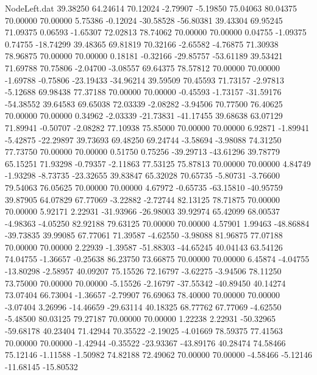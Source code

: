 \begin{filecontents}{NodeLeft.dat}
  39.38250   64.24614   70.12024    -2.79907   -5.19850   75.04063   80.04375   70.00000   70.00000    5.75386   -0.12024  -30.58528  -56.80381
  39.43304   69.95245   71.09375     0.06593   -1.65307   72.02813   78.74062   70.00000   70.00000    0.04755   -1.09375    0.74755  -18.74299
  39.48365   69.81819   70.32166    -2.65582   -4.76875   71.30938   78.96875   70.00000   70.00000    0.18181   -0.32166  -29.85757  -53.61189
  39.53421   71.69788   70.75806    -2.04700   -3.08557   69.64375   78.57812   70.00000   70.00000   -1.69788   -0.75806  -23.19433  -34.96214
  39.59509   70.45593   71.73157    -2.97813   -5.12688   69.98438   77.37188   70.00000   70.00000   -0.45593   -1.73157  -31.59176  -54.38552
  39.64583   69.65038   72.03339    -2.08282   -3.94506   70.77500   76.40625   70.00000   70.00000    0.34962   -2.03339  -21.73831  -41.17455
  39.68638   63.07129   71.89941    -0.50707   -2.08282   77.10938   75.85000   70.00000   70.00000    6.92871   -1.89941   -5.42875  -22.29897
  39.73693   69.48250   69.24744    -3.58694   -3.98088   74.31250   77.73750   70.00000   70.00000    0.51750    0.75256  -39.29713  -43.61296
  39.78779   65.15251   71.93298    -0.79357   -2.11863   77.53125   75.87813   70.00000   70.00000    4.84749   -1.93298   -8.73735  -23.32655
  39.83847   65.32028   70.65735    -5.80731   -3.76600   79.54063   76.05625   70.00000   70.00000    4.67972   -0.65735  -63.15810  -40.95759
  39.87905   64.07829   67.77069    -3.22882   -2.72744   82.13125   78.71875   70.00000   70.00000    5.92171    2.22931  -31.93966  -26.98003
  39.92974   65.42099   68.00537    -4.98363   -4.05250   82.92188   79.63125   70.00000   70.00000    4.57901    1.99463  -48.86884  -39.73835
  39.99085   67.77061   71.39587    -4.62550   -3.98088   81.96875   77.07188   70.00000   70.00000    2.22939   -1.39587  -51.88303  -44.65245
  40.04143   63.54126   74.04755    -1.36657   -0.25638   86.23750   73.66875   70.00000   70.00000    6.45874   -4.04755  -13.80298   -2.58957
  40.09207   75.15526   72.16797    -3.62275   -3.94506   78.11250   73.75000   70.00000   70.00000   -5.15526   -2.16797  -37.55342  -40.89450
  40.14274   73.07404   66.73004    -1.36657   -2.79907   76.69063   78.40000   70.00000   70.00000   -3.07404    3.26996  -14.46659  -29.63114
  40.18325   68.77762   67.77069    -4.62550   -5.48500   80.03125   79.27187   70.00000   70.00000    1.22238    2.22931  -50.32965  -59.68178
  40.23404   71.42944   70.35522    -2.19025   -4.01669   78.59375   77.41563   70.00000   70.00000   -1.42944   -0.35522  -23.93367  -43.89176
  40.28474   74.58466   75.12146    -1.11588   -1.50982   74.82188   72.49062   70.00000   70.00000   -4.58466   -5.12146  -11.68145  -15.80532

\end{filecontents}
